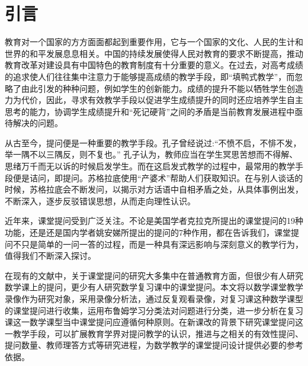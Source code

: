 \chapter{引言}

教育对一个国家的方方面面都起到重要作用，它与一个国家的文化、人民的生计和世界的和平发展息息相关。中国的持续发展使得人民对教育的要求不断提高，推动教育改革对建设具有中国特色的教育制度有十分重要的意义。在过去，对高考成绩的追求使人们往往集中注意力于能够提高成绩的教学手段，即“填鸭式教学”，而忽略了由此引发的种种问题，例如学生的创新能力。成绩的提升不能以牺牲学生创造力为代价，因此，寻求有效教学手段以促进学生成绩提升的同时还应培养学生自主思考的能力，协调学生成绩提升和“死记硬背”之间的矛盾是当前教育发展进程中亟待解决的问题。

从古至今，提问便是一种重要的教学手段。孔子曾经说过:“不愤不启，不悱不发，举一隅不以三隅反，则不复也。” 孔子认为，教师应当在学生冥思苦想而不得解、思绪万千而无以诉的时候启发学生。而在这启发式教学的过程中，最常用的教学手段便是诘问，即提问。苏格拉底使用“产婆术”帮助人们获取知识。在与别人谈话的时候，苏格拉底会不断发问，以揭示对方话语中自相矛盾之处，从具体事例出发，不断深入，逐步反驳错误思想，从而走向理性认识。

近年来，课堂提问受到广泛关注。不论是美国学者克拉克所提出的课堂提问的19种功能，还是还是国内学者姚安娣所提出的提问的7种作用，都在告诉我们，课堂提问不只是简单的一问一答的过程，而是一种具有深远影响与深刻意义的教学行为，值得我们不断深入探讨。

在现有的文献中，关于课堂提问的研究大多集中在普通教育方面，但很少有人研究数学课上的提问，更少有人研究数学复习课中的课堂提问。本文将以数学课堂教学录像作为研究对象，采用录像分析法，通过反复观看录像，对复习课这种数学课型的课堂提问进行收集，运用布鲁姆学习分类法对问题进行分类，进一步分析在复习课这一数学课型当中课堂提问应遵循何种原则。在新课改的背景下研究课堂提问这一教学手段，可以扩展教育学界对提问教学的认识，推进与之相关的有效性提问、提问数量、教师理答方式等研究进程，为数学教学的课堂提问设计提供必要的参考依据。